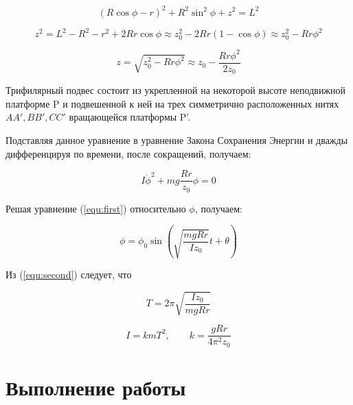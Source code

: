 \documentclass[a4paper,12pt]{article} %
\begin{document}
			\[ (R\cos\phi - r)^2 + R^2\sin^2\phi + z^2 = L^2  \]

		
			\[ z^2 = L^2 - R^2 - r^2 + 2Rr\cos\phi \approx z^2_{0} - 2Rr(1 - \cos\phi) \approx z^2_{0} - Rr\phi^2 \]


			\[ z = \sqrt{z^2_{0} - Rr\phi^2} \approx z_{0} - \frac{Rr\phi^2}{2z_{0}}\]
			

		Трифилярный подвес состоит из укрепленной на некоторой высоте 				неподвижной 	платформе P и подвешенной к ней на трех симметрично расположенных нитях $ AA', BB', CC' $ вращающейся платформы P'.
	
		Подставляя данное уравнение в уравнение Закона Сохранения Энергии и дважды дифференцируя по 				времени, после сокращений, получаем:
		
	\begin{equation}
		 I\ddot{\phi}^2 + mg\frac{Rr}{z_{0}}\phi = 0 
		 \label{equ:first}	
	\end{equation}
	
	
		Решая уравнение (\ref{equ:first}) относительно $\phi$, получаем:
			
	
	\begin{equation}
		\phi = \phi_{0}\sin\left(\sqrt{\frac{mgRr}{Iz_{0}}}t + \theta\right)
		\label{equ:second}
	\end{equation}
	
	
	Из (\ref{equ:second}) следует, что 
	
	\begin{equation}
		T = 2\pi\sqrt{\frac{Iz_{0}}{mgRr}}		
	\end{equation}
	
	\begin{equation}
		I = kmT^2, \qquad k = \frac{gRr}{4\pi^2z_{0}} 
		\label{equ:four}
	\end{equation}

\newpage
\section{Выполнение работы}
\end{document}
